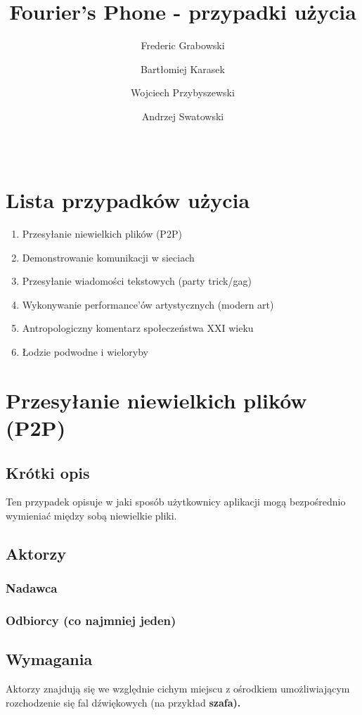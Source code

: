 \documentclass{article}
\title{Fourier's Phone - przypadki użycia}
\author{Frederic Grabowski \and Bartłomiej Karasek \and Wojciech Przybyszewski 
        \and Andrzej Swatowski}
\date{\documentdate \\ \documentversion}
\begin{document}
\maketitle
\newpage

\tableofcontents
\newpage

\section{Lista przypadków użycia}
    \begin{enumerate}
        \item Przesyłanie niewielkich plików (P2P)
        \item Demonstrowanie komunikacji w sieciach
        \item Przesyłanie wiadomości tekstowych (party trick/gag)
        \item Wykonywanie performance'ów artystycznych (modern art)
        \item Antropologiczny komentarz społeczeństwa XXI wieku
        \item Łodzie podwodne i wieloryby
    \end{enumerate}

\newpage
\section{Przesyłanie niewielkich plików (P2P)}
\subsection{Krótki opis}
Ten przypadek opisuje w jaki sposób użytkownicy aplikacji mogą bezpośrednio wymieniać między sobą niewielkie pliki.
\subsection{Aktorzy}
\subsubsection{Nadawca}
\subsubsection{Odbiorcy (co najmniej jeden)}
\subsection{Wymagania}
Aktorzy znajdują się we względnie cichym miejscu z ośrodkiem umożliwiającym rozchodzenie się fal dźwiękowych (na przykład \bf{szafa}).
\end{document}
